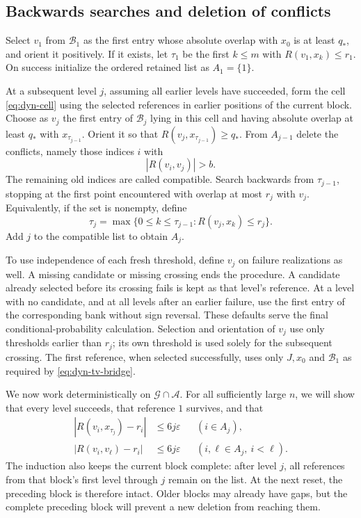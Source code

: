 \subsection{Backwards searches and deletion of conflicts}

Select $v_1$ from $\mathcal B_1$ as the first entry whose absolute overlap
with $x_0$ is at least $q_*$, and orient it positively. If it exists, let
$\tau_1$ be the first $k\leq m$ with $R(v_1,x_k)\leq r_1$. On success
initialize the ordered retained list as $A_1=\{1\}$.

At a subsequent level $j$, assuming all earlier levels have succeeded,
form the cell \eqref{eq:dyn-cell} using the selected references in earlier
positions of the current block. Choose as $v_j$ the first entry of
$\mathcal B_j$ lying in this cell and having absolute overlap at least
$q_*$ with $x_{\tau_{j-1}}$. Orient it so that
$R(v_j,x_{\tau_{j-1}})\geq q_*$. From $A_{j-1}$ delete the conflicts,
namely those indices $i$ with
\begin{equation}\label{eq:dyn-conflict}
 |R(v_i,v_j)|>b.
\end{equation}
The remaining old indices are called compatible. Search backwards from
$\tau_{j-1}$, stopping at the first point encountered with overlap at
most $r_j$ with $v_j$. Equivalently, if the set is nonempty, define
\begin{equation}\label{eq:dyn-backward-time}
 \tau_j=\max\{0\leq k\leq\tau_{j-1}:R(v_j,x_k)\leq r_j\}.
\end{equation}
Add $j$ to the compatible list to obtain $A_j$.

To use independence of each fresh threshold, define $v_j$ on failure
realizations as well. A missing candidate or missing crossing ends
the procedure. A candidate already selected before its crossing fails is
kept as that level's reference. At a level with no candidate, and at all
levels after an earlier failure, use the first entry of the corresponding
bank without sign reversal. These defaults serve the final conditional-probability calculation.
Selection and orientation of $v_j$ use only thresholds earlier than
$r_j$; its own threshold is used solely for the subsequent crossing. The first reference, when selected successfully, uses only
$J,x_0$ and $\mathcal B_1$ as required by
\eqref{eq:dyn-tv-bridge}.

We now work deterministically on $\mathcal G\cap\mathcal A$.
For all sufficiently large $n$, we will show that every level succeeds,
that reference $1$ survives, and that
\begin{align}
 |R(v_i,x_{\tau_j})-r_i|&\leq6j\varepsilon
                  &&(i\in A_j),\label{eq:dyn-induction-path}\\
 |R(v_i,v_\ell)-r_i|&\leq6j\varepsilon
                  &&(i,\ell\in A_j,\ i<\ell).
                  \label{eq:dyn-induction-references}
\end{align}
The induction also keeps the current block complete: after level $j$,
all references from that block's first level through $j$ remain on the
list. At the next reset, the preceding block is therefore intact.
Older blocks may already have gaps, but the complete preceding block
will prevent a new deletion from reaching them.


